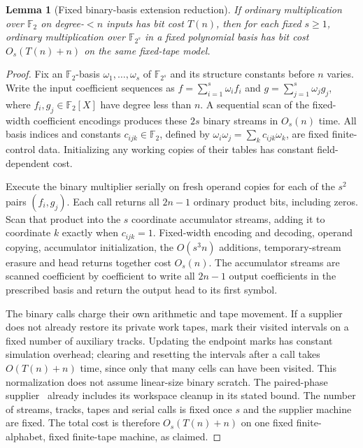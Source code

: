 \documentclass[11pt]{article}
\newtheorem{lemma}{Lemma}
\theoremstyle{definition}
\newcommand{\F}{\mathbb F}
\begin{document}
\begin{lemma}[Fixed binary-basis extension reduction]
\label{lem:binary-extension}
If ordinary multiplication over $\F_2$ on degree-$<n$ inputs has bit
cost $T(n)$, then for each fixed $s\ge1$, ordinary multiplication
over $\F_{2^s}$ in a fixed polynomial basis has bit cost
$O_s(T(n)+n)$ on the same fixed-tape model.
\end{lemma}
\begin{proof}
Fix an $\F_2$-basis $\omega_1,\ldots,\omega_s$ of $\F_{2^s}$ and its
structure constants before $n$ varies.
Write the input coefficient sequences as
$f=\sum_{i=1}^s\omega_i f_i$ and $g=\sum_{j=1}^s\omega_jg_j$,
where $f_i,g_j\in\F_2[X]$ have degree less than $n$. A sequential
scan of the fixed-width coefficient encodings produces these $2s$
binary streams in $O_s(n)$ time. All basis indices and constants
$c_{ijk}\in\F_2$, defined by
$\omega_i\omega_j=\sum_k c_{ijk}\omega_k$, are fixed finite-control
data. Initializing any working copies of their tables has constant
field-dependent cost.

Execute the binary multiplier serially on fresh operand copies for
each of the $s^2$ pairs $(f_i,g_j)$. Each call returns all $2n-1$
ordinary product bits, including zeros. Scan that product into the
$s$ coordinate accumulator streams, adding it to coordinate $k$
exactly when $c_{ijk}=1$. Fixed-width encoding and decoding,
operand copying, accumulator initialization, the $O(s^3n)$ additions,
temporary-stream erasure and head returns together cost $O_s(n)$.
The accumulator streams are scanned coefficient by coefficient to
write all $2n-1$ output coefficients in the prescribed basis and
return the output head to its first symbol.

The binary calls charge their own arithmetic and tape movement. If
a supplier does not already restore its private work tapes, mark
their visited intervals on a fixed number of auxiliary tracks.
Updating the endpoint marks has constant simulation overhead;
clearing and resetting the intervals after a call takes
$O(T(n)+n)$ time, since only that many cells can have been visited.
This normalization does not assume linear-size binary scratch.
The paired-phase supplier~\cite{PairedPhase} already includes its
workspace cleanup in its stated bound. The number of streams,
tracks, tapes and serial calls is fixed once $s$ and the supplier
machine are fixed. The total cost is therefore $O_s(T(n)+n)$ on
one fixed finite-alphabet, fixed finite-tape machine, as claimed.
\end{proof}
\end{document}
